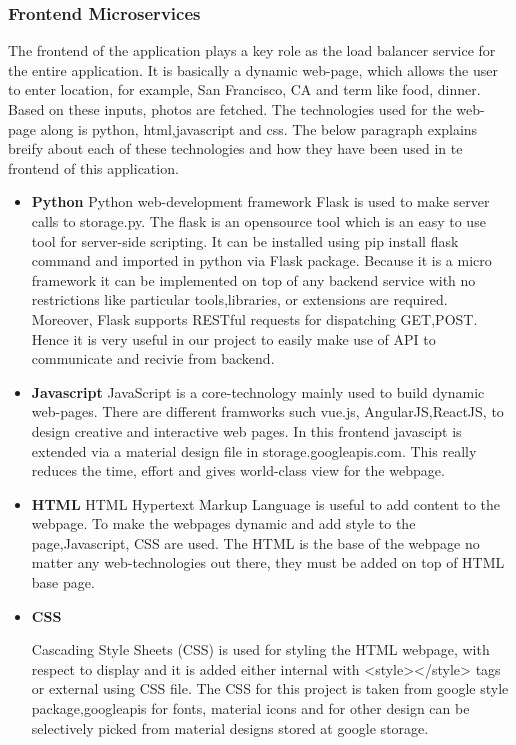 \subsubsection{Frontend Microservices}

The frontend of the application plays a key role as the load balancer
service for the entire application. It is basically a dynamic
web-page, which allows the user to enter location, for example, San
Francisco, CA and term like food, dinner. Based on these inputs,
photos are fetched. The technologies used for the web-page along is
python, html,javascript and css. The below paragraph explains breify
about each of these technologies and how they have been used in te
frontend of this application.

\begin{itemize}
\item\textbf{Python} Python web-development framework Flask is used to
  make server calls to storage.py. The flask is an opensource tool
  which is an easy to use tool for server-side scripting. It can be
  installed using pip install flask command and imported in python via
  Flask package. Because it is a micro framework it can be implemented
  on top of any backend service with no restrictions like particular
  tools,libraries, or extensions are required. Moreover, Flask
  supports RESTful requests for dispatching GET,POST. Hence it is very
  useful in our project to easily make use of API to communicate and
  recivie from backend.

  
\item\textbf{Javascript} JavaScript is a core-technology mainly used
  to build dynamic web-pages. There are different framworks such
  vue.js, AngularJS,ReactJS, to design creative and interactive web
  pages. In this frontend javascipt is extended via a material design
  file in storage.googleapis.com. This really reduces the time, effort
  and gives world-class view for the webpage.
  
\item\textbf{HTML} HTML Hypertext Markup Language is useful to add
  content to the webpage. To make the webpages dynamic and add style
  to the page,Javascript, CSS are used. The HTML is the base of the
  webpage no matter any web-technologies out there, they must be added
  on top of HTML base page.
  
\item\textbf{CSS}

  Cascading Style Sheets (CSS) is used for styling the HTML webpage,
  with respect to display and it is added either internal with
  <style></style> tags or external using CSS file. The CSS for this
  project is taken from google style package,googleapis for fonts,
  material icons and for other design can be selectively picked from
  material designs stored at google storage.
  
\end{itemize}

